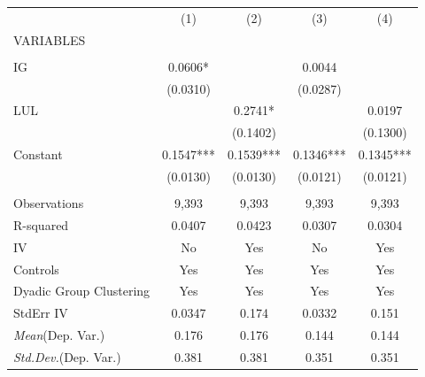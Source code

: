 \documentclass[]{article}
\begin{document}
\begin{tabular}{lcccc} \hline
 & (1) & (2) & (3) & (4) \\
VARIABLES &  &  &  &  \\ \hline
 &  &  &  &  \\
IG & 0.0606* &  & 0.0044 &  \\
 & (0.0310) &  & (0.0287) &  \\
LUL &  & 0.2741* &  & 0.0197 \\
 &  & (0.1402) &  & (0.1300) \\
Constant & 0.1547*** & 0.1539*** & 0.1346*** & 0.1345*** \\
 & (0.0130) & (0.0130) & (0.0121) & (0.0121) \\
 &  &  &  &  \\
Observations & 9,393 & 9,393 & 9,393 & 9,393 \\
R-squared & 0.0407 & 0.0423 & 0.0307 & 0.0304 \\
IV & No & Yes & No & Yes \\
Controls & Yes & Yes & Yes & Yes \\
Dyadic Group Clustering & Yes & Yes & Yes & Yes \\
StdErr IV & 0.0347 & 0.174 & 0.0332 & 0.151 \\
\textit{Mean}(Dep. Var.) & 0.176 & 0.176 & 0.144 & 0.144 \\
 \textit{Std.Dev.}(Dep. Var.) & 0.381 & 0.381 & 0.351 & 0.351 \\ \hline
\end{tabular}
\end{document}
